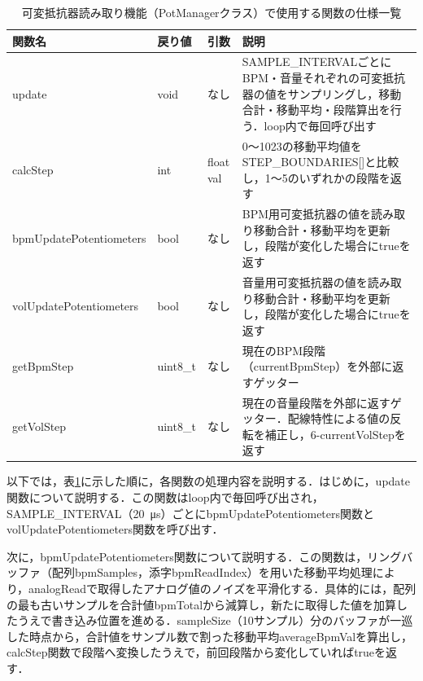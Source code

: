 \begin{table}[H]
    \caption{可変抵抗器読み取り機能（PotManagerクラス）で使用する関数の仕様一覧}
    \centering
    \label{table:siki_pot_func}
    \begin{tabular}{p{5.0cm}p{1.5cm}p{2.2cm}p{4.8cm}}
    \hline
    \textbf{関数名} & \textbf{戻り値} & \textbf{引数} & \textbf{説明}\\
    \hline
    update & void & なし & SAMPLE\_INTERVALごとにBPM・音量それぞれの可変抵抗器の値をサンプリングし，移動合計・移動平均・段階算出を行う．loop内で毎回呼び出す\\
    \hline
    calcStep & int & float val & 0〜1023の移動平均値をSTEP\_BOUNDARIES[]と比較し，1〜5のいずれかの段階を返す\\
    \hline
    bpmUpdatePotentiometers & bool & なし & BPM用可変抵抗器の値を読み取り移動合計・移動平均を更新し，段階が変化した場合にtrueを返す\\
    \hline
    volUpdatePotentiometers & bool & なし & 音量用可変抵抗器の値を読み取り移動合計・移動平均を更新し，段階が変化した場合にtrueを返す\\
    \hline
    getBpmStep & uint8\_t & なし & 現在のBPM段階（currentBpmStep）を外部に返すゲッター\\
    \hline
    getVolStep & uint8\_t & なし & 現在の音量段階を外部に返すゲッター．配線特性による値の反転を補正し，6-currentVolStepを返す\\
    \hline
    \end{tabular}
\end{table}

\fi

\iffalse


以下では，表\ref{table:siki_pot_func}に示した順に，各関数の処理内容を説明する．はじめに，update関数について説明する．この関数はloop内で毎回呼び出され，SAMPLE\_INTERVAL（\SI{20}{\micro\second}）ごとにbpmUpdatePotentiometers関数とvolUpdatePotentiometers関数を呼び出す．


次に，bpmUpdatePotentiometers関数について説明する．この関数は，リングバッファ（配列bpmSamples，添字bpmReadIndex）を用いた移動平均処理により，analogReadで取得したアナログ値のノイズを平滑化する．具体的には，配列の最も古いサンプルを合計値bpmTotalから減算し，新たに取得した値を加算したうえで書き込み位置を進める．sampleSize（10サンプル）分のバッファが一巡した時点から，合計値をサンプル数で割った移動平均averageBpmValを算出し，calcStep関数で段階へ変換したうえで，前回段階から変化していればtrueを返す．

